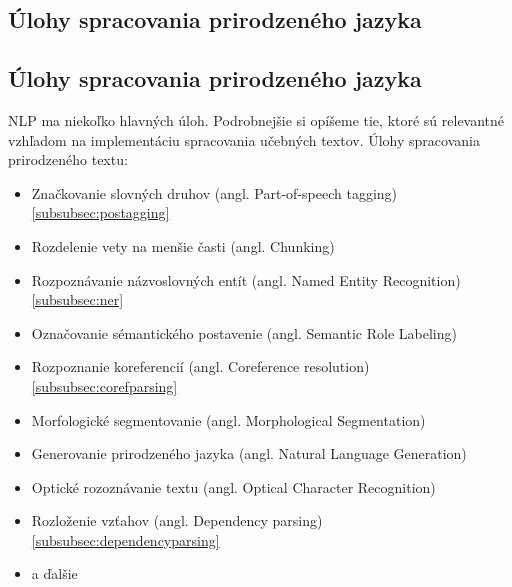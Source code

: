 %
%
{
	\subsection{Úlohy spracovania prirodzeného jazyka}
}
{
	\subsection{Úlohy spracovania prirodzeného jazyka}
}
\label{subsec:tasksofnlp}
NLP ma niekoľko hlavných úloh. Podrobnejšie si opíšeme tie, ktoré sú relevantné vzhľadom na implementáciu spracovania učebných textov.
Úlohy spracovania prirodzeného textu:~\cite{collobert2011} 
\begin{itemize}
	\item Značkovanie slovných druhov (angl. Part-of-speech tagging) \ref{subsubsec:postagging}
	\item Rozdelenie vety na menšie časti (angl. Chunking)
	\item Rozpoznávanie názvoslovných entít (angl. Named Entity Recognition) \ref{subsubsec:ner}
	\item Označovanie sémantického postavenie (angl. Semantic Role Labeling)
	\item Rozpoznanie koreferencií (angl. Coreference resolution) \ref{subsubsec:corefparsing}
	\item Morfologické segmentovanie (angl. Morphological Segmentation)
	\item Generovanie prirodzeného jazyka (angl. Natural Language Generation)
	\item Optické rozoznávanie textu (angl. Optical Character Recognition)
	\item Rozloženie vzťahov (angl. Dependency parsing) \ref{subsubsec:dependencyparsing}
	\item a ďalšie
\end{itemize}

